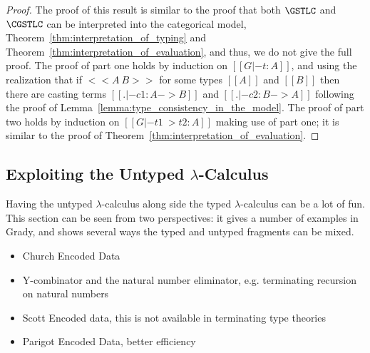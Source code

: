 \begin{proof}
  The proof of this result is similar to the proof that both
  $\GSTLC$ and $\CGSTLC$ can be
  interpreted into the categorical model,
  Theorem~\ref{thm:interpretation_of_typing} and
  Theorem~\ref{thm:interpretation_of_evaluation}, and thus, we do not
  give the full proof.  The proof of part one holds by induction on
  $[[G |- t : A]]$, and using the realization that if $<<A ~ B>>$ for
  some types $[[A]]$ and $[[B]]$ then there are casting terms $[[. |-
      c1 : A -> B]]$ and $[[. |- c2 : B -> A]]$ following the proof of
  Lemma~\ref{lemma:type_consistency_in_the_model}. The proof of part
  two holds by induction on $[[G |- t1 ~> t2 : A]]$ making use of part
  one; it is similar to the proof of
  Theorem~\ref{thm:interpretation_of_evaluation}.
\end{proof}

\subsection{Exploiting the Untyped $\lambda$-Calculus}
\label{subsec:exploiting_the_untyped_lambda-calculus}
Having the untyped $\lambda$-calculus along side the typed
$\lambda$-calculus can be a lot of fun.  This section can be seen from
two perspectives: it gives a number of examples in Grady, and shows
several ways the typed and untyped fragments can be mixed.
\begin{itemize}
\item Church Encoded Data
\item Y-combinator and the natural number eliminator, e.g. terminating recursion on natural numbers
\item Scott Encoded data, this is not available in terminating type theories
\item Parigot Encoded Data, better efficiency 
\end{itemize}

